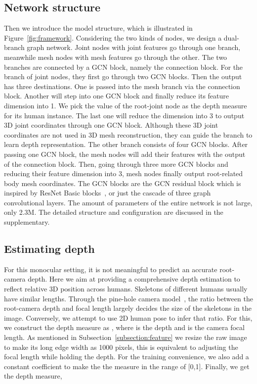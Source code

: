 \documentclass[runningheads]{llncs}
\begin{document}
\subsection{Network structure}\label{subsection:network}

Then we introduce the model structure, which is illustrated in Figure~\ref{fig:framework}. Considering the two kinds of nodes, we design a dual-branch graph network. Joint nodes with joint features go through one branch, meanwhile mesh nodes with mesh features go through the other. The two branches are connected by a GCN block, namely the connection block. 
For the branch of joint nodes, they first go through two GCN blocks. Then the output has three destinations. One is passed into the mesh branch via the connection block. Another will step into one GCN block and finally reduce its feature dimension into 1. We pick the value of the root-joint node as the depth measure for its human instance. The last one will reduce the dimension into 3 to output 3D joint coordinates through one GCN block. Although these 3D joint coordinates are not used in 3D mesh reconstruction, they can guide the branch to learn depth representation. The other branch consists of four GCN blocks. After passing one GCN block, the mesh nodes will add their features with the output of the connection block. Then, going through three more GCN blocks and reducing their feature dimension into 3, mesh nodes finally output root-related body mesh coordinates. The GCN blocks are the GCN residual block which is inspired by ResNet Basic blocks~\cite{he2016deep}, or just the cascade of three graph convolutional layers. The amount of parameters of the entire network is not large, only 2.3M. The detailed structure and configuration are discussed in the supplementary. 

\subsection{Estimating depth}\label{subsection:Depth}
For this monocular setting, it is not meaningful to predict an accurate root-camera depth. Here we aim at providing a comprehensive depth estimation to reflect relative 3D position across humans. Skeletons of different humans usually have similar lengths. Through the pine-hole camera model~\cite{fusiello2006elements}, the ratio between the root-camera depth and focal length largely decides the size of the skeletons in the image. Conversely, we attempt to use 2D human pose to infer that ratio. For this, we construct the depth measure as ,
where  is the depth and  is the camera focal length. 
As mentioned in Subsection~\ref{subsection:feature} 
we resize the raw image to make its long edge width as 1000 pixels,
this is equivalent to adjusting the focal length while holding the depth. For the training convenience, we also add a constant coefficient  to make the the measure in the range of [0,1]. Finally, we get the depth measure,
\end{document}

